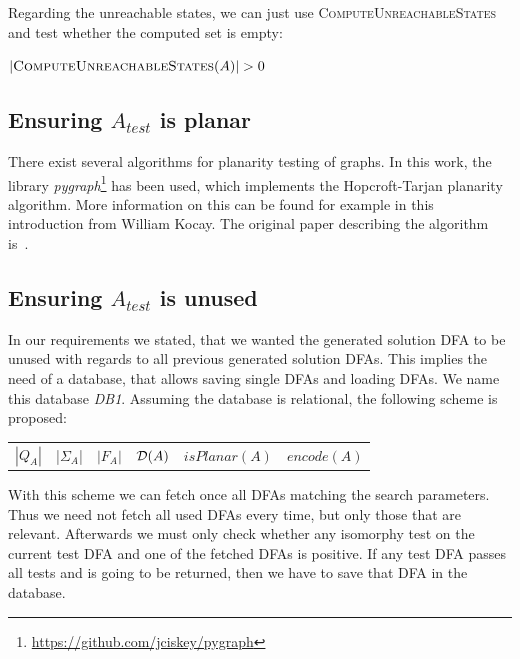 Regarding the unreachable states, we can just use \textsc{ComputeUnreachableStates} and test whether the computed set is empty:
\vspace{0.2cm}
\begin{algorithmic}[1]
	\State \Return $|\textsc{ComputeUnreachableStates}(A)| > 0$
	\EndFunction
\end{algorithmic}

\subsection{Ensuring $A_{test}$ is planar}

There exist several algorithms for planarity testing of graphs. In this work, the library \emph{pygraph}\footnote{\url{https://github.com/jciskey/pygraph}} has been used, which implements the Hopcroft-Tarjan planarity algorithm. More information on this can be found for example in this~\cite{kocay93} introduction from William Kocay. The original paper describing the algorithm is~\cite{hopcroft74}.

\subsection{Ensuring $A_{test}$ is unused}

In our requirements we stated, that we wanted the generated solution DFA to be unused with regards to all previous generated solution DFAs. This implies the need of a database, that allows saving single DFAs and loading DFAs. We name this database \emph{DB1}. Assuming the database is relational, the following scheme is proposed:
\begin{center}
	\begin{tabular}{c c c c c c}
	$|Q_A|$ & |$\Sigma_A$| & $|F_A|$ & $\mathcal{D}(A)$ & $isPlanar(A)$ & $encode(A)$
	\end{tabular}
\end{center}
With this scheme we can fetch once all DFAs matching the search parameters. Thus we need not fetch all used DFAs every time, but only those that are relevant. Afterwards we must only check whether any isomorphy test on the current test DFA and one of the fetched DFAs is positive. If any test DFA passes all tests and is going to be returned, then we have to save that DFA in the database.

